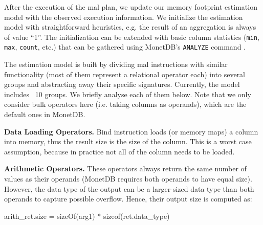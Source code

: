 \documentclass[conference]{IEEEtran}
\def\Skip{\par\medskip\nobreak\noindent}
\begin{document}
After the execution of the {\sc mal} plan, we update our memory footprint estimation model with the observed execution information.
We initialize the estimation model with straightforward heuristics, e.g. the result of an aggregation is always of value ``1''.
The initialization can be extended with basic column statistics (\texttt{\small min}, \texttt{\small max}, \texttt{\small count}, etc.) that can be gathered using MonetDB’s \texttt{\small ANALYZE} command .

The estimation model is built by dividing {\sc mal} instructions with similar functionality (most of them represent a relational operator each) into several groups and abstracting away their specific signatures.
Currently, the model includes ~10 groups.
We briefly analyse each of them below.
Note that we only consider bulk operators here (i.e. taking columns as operands), which are the default ones in MonetDB.

\Skip\textbf{Data Loading Operators.}
Bind instruction loads (or memory maps) a column into memory, thus the result size is the size of the column.
This is a worst case assumption, because in practice not all of the column needs to be loaded.

\Skip\textbf{Arithmetic Operators.}
%
These operators always return the same number of values as their operands (MonetDB requires both operands to have equal size).
However, the data type of the output can be a larger-sized data type than both operands to capture possible overflow.
Hence, their output size is computed as:
\begin{verb}
arith_ret.size = sizeOf(arg1) * sizeof(ret.data_type)
\end{verb}
\end{document}

